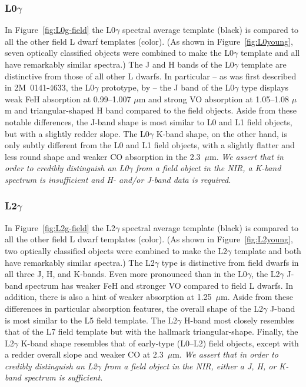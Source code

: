 \documentclass[12pt,preprint]{aastex}
\begin{document}
\subsubsection{L0$\gamma$}
In Figure~\ref{fig:L0g-field} the L0$\gamma$ spectral average template (black) is compared to all the other field L dwarf templates (color). (As shown in Figure~\ref{fig:L0young}, seven optically classified objects were combined to make the L0$\gamma$ template and all have remarkably similar spectra.) The J and H bands of the L0$\gamma$ template are distinctive from those of all other L dwarfs. In particular -- as was first described in 2M~0141-4633, the L0$\gamma$ prototype, by \cite{Kirkpatrick06} -- the J band of the L0$\gamma$ type displays weak FeH absorption at 0.99--1.007 $\mu$m and strong VO absorption at 1.05--1.08 $\mu$m and triangular-shaped H band compared to the field objects. Aside from these notable differences, the J-band shape is most similar to L0 and L1 field objects, but with a slightly redder slope. The L0$\gamma$ K-band shape, on the other hand, is only subtly different from the L0 and L1 field objects, with a slightly flatter and less round shape and weaker CO absorption in the 2.3~$\mu$m. 
\emph{We assert that in order to credibly distinguish an L0$\gamma$ from a field object in the NIR, a K-band spectrum is insufficient and H- and/or J-band data is required.}

\subsubsection{L2$\gamma$}
In Figure~\ref{fig:L2g-field} the L2$\gamma$ spectral average template (black) is compared to all the other field L dwarf templates (color). (As shown in Figure~\ref{fig:L2young}, two optically classified objects were combined to make the L2$\gamma$ template and both have remarkably similar spectra.) 
The L2$\gamma$ type is distinctive from field dwarfs in all three J, H, and K-bands. 
Even more pronounced than in the L0$\gamma$, the L2$\gamma$ J-band spectrum has weaker FeH and stronger VO compared to field L dwarfs. 
In addition, there is also a hint of weaker  absorption at 1.25~$\mu$m. Aside from these differences in particular absorption features, the overall shape of the L2$\gamma$ J-band is most similar to the L5 field template.
The L2$\gamma$ H-band most closely resembles that of the L7 field template but with the hallmark  triangular-shape. 
Finally, the L2$\gamma$ K-band shape resembles that of early-type (L0--L2) field objects, except with a redder overall slope and weaker CO at 2.3~$\mu$m. 
\emph{We assert that in order to credibly distinguish an L2$\gamma$ from a field object in the NIR, either a J, H, or K-band spectrum is sufficient.}
\end{document}
